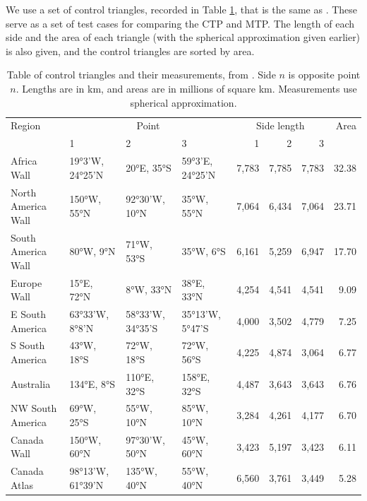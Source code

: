 \documentclass[]{interact}
\begin{document}
We use a set of control triangles, recorded in Table \ref{table:ctrlpts}, that
is the same as \citet[p.~90]{christensen}. These serve as a set of
test cases for comparing the CTP and MTP. The length of each side and the area
of each triangle (with the spherical approximation given earlier) is also given,
and the control triangles are sorted by area.

\begin{table}
\begin{tabular}{ p{2.5cm} | p{1.3cm} p{1.3cm} p{1.4cm} | r r r | r }
Region & \multicolumn{3}{c}{Point} &
  \multicolumn{3}{c}{Side length} &  Area \\
& 1 & 2 & 3 & 1 & 2 & 3 & \\
\hline
Africa Wall & 19°3'W, 24°25'N & 20°E, 35°S & 59°3'E, 24°25'N &
  7,783 & 7,785 & 7,783 & 32.38 \\
North \mbox{America} Wall & 150°W, 55°N & 92°30'W, 10°N & 35°W, 55°N &
  7,064 & 6,434 & 7,064 & 23.71 \\
South \mbox{America} Wall & 80°W, 9°N & 71°W, 53°S & 35°W, 6°S &
  6,161 & 5,259 & 6,947 & 17.70 \\
Europe Wall & 15°E, 72°N & 8°W, 33°N & 38°E, 33°N &
  4,254 & 4,541 & 4,541 & 9.09 \\
E South \mbox{America} & 63°33'W, 8°8'N & 58°33'W, 34°35'S & 35°13'W, 5°47'S &
  4,000 & 3,502 & 4,779 & 7.25 \\
S South \mbox{America} & 43°W, 18°S & 72°W, 18°S & 72°W, 56°S &
  4,225 & 4,874 & 3,064 & 6.77 \\
Australia & 134°E, 8°S & 110°E, 32°S & 158°E, 32°S &
  4,487 & 3,643 & 3,643 & 6.76 \\
NW South \mbox{America} & 69°W, 25°S & 55°W, 10°N & 85°W, 10°N &
  3,284 & 4,261 & 4,177 & 6.70 \\
Canada Wall & 150°W, 60°N & 97°30'W, 50°N & 45°W, 60°N &
  3,423 & 5,197 & 3,423 & 6.11 \\
Canada \mbox{Atlas} & 98°13'W, 61°39'N & 135°W, 40°N & 55°W, 40°N &
  6,560 & 3,761 & 3,449 & 5.28
\end{tabular}
\caption{Table of control triangles and their measurements, from
\citet{christensen}. Side $n$ is opposite point $n$. Lengths are in km,
and areas are in millions of square km.
Measurements use spherical approximation.}
\label{table:ctrlpts}
\end{table}
\end{document}
